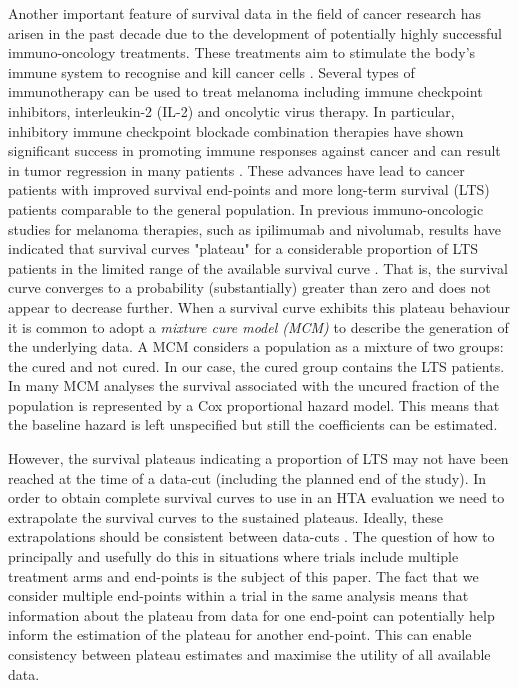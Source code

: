 \documentclass[AMA,STIX1COL]{WileyNJD-v2}
\begin{document}
Another important feature of survival data in the field of cancer research has arisen in the past decade due to the development of potentially highly successful immuno-oncology treatments.
These treatments aim to stimulate the body’s immune system to recognise and kill cancer cells \cite{Ouwens2019}. Several types of immunotherapy can be used to treat melanoma including immune checkpoint inhibitors, interleukin-2 (IL-2) and oncolytic virus therapy.
In particular, inhibitory immune checkpoint blockade combination therapies have shown significant success in promoting immune responses against cancer and can result in tumor regression in many patients \cite{Khair2019}.
These advances have lead to cancer patients with improved survival end-points and more long-term survival (LTS) patients comparable to the general population.
In previous immuno-oncologic studies for melanoma therapies, such as ipilimumab and nivolumab,
results have indicated that survival curves "plateau" for a considerable proportion of LTS patients in the limited range of the available survival curve \citep{Wolchok2017, Larkin2019}.
That is, the survival curve converges to a probability (substantially) greater than zero and does not appear to decrease further.
When a survival curve exhibits this plateau behaviour it is common to adopt a \textit{mixture cure model (MCM)} to describe the generation of the underlying data.
A MCM considers a population as a mixture of two groups: the cured and not cured.
In our case, the cured group contains the LTS patients.
In many MCM analyses the survival associated with the uncured fraction of the population is represented by a Cox proportional hazard model.
This means that the baseline hazard is left unspecified but still the coefficients can be estimated.

However, the survival plateaus indicating a proportion of LTS may not have been reached at the time of a data-cut (including the planned end of the study).
In order to obtain complete survival curves to use in an HTA evaluation we need to extrapolate the survival curves to the sustained plateaus.
Ideally, these extrapolations should be consistent between data-cuts \citep{Bullement2020}.
The question of how to principally and usefully do this in situations where trials include multiple treatment arms and end-points is the subject of this paper.
The fact that we consider multiple end-points within a trial in the same analysis means that information about the plateau from data for one end-point can potentially help inform the estimation of the plateau for another end-point.
This can enable consistency between plateau estimates and maximise the utility of all available data.
\end{document}
